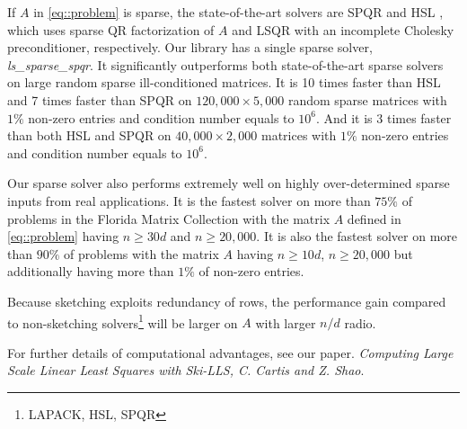 \documentclass[english,11pt]{article}
\begin{document}
If $A$ in \eqref{eq::problem} is sparse, the state-of-the-art solvers are SPQR \cite{Davis:2011ft} and HSL \cite{Scott:2014iq}, which uses sparse QR factorization of $A$ and LSQR with an incomplete Cholesky preconditioner, respectively. Our library has a single sparse solver, {\it ls_sparse_spqr}. It significantly outperforms both state-of-the-art sparse solvers on large random sparse ill-conditioned matrices. It is 10 times faster than HSL and 7 times faster than SPQR on $120,000 \times 5,000$ random sparse matrices with $1\%$ non-zero entries and condition number equals to $10^6$. And it is 3 times faster than both HSL and SPQR on $40,000 \times 2,000$ matrices with $1\%$ non-zero entries and condition number equals to $10^6$.

Our sparse solver also performs extremely well on highly over-determined sparse inputs from real applications. It is the fastest solver on more than $75 \%$ of problems in the Florida Matrix Collection \cite{Davis_2011} with the matrix $A$ defined in \eqref{eq::problem} having $n\geq 30d$ and $n \geq 20,000$. It is also the fastest solver on more than $90\%$ of problems with the matrix $A$ having $n\geq 10d$, $n \geq 20,000$ but additionally having more than $1\%$ of non-zero entries. 

Because sketching exploits redundancy of rows, the performance gain compared to non-sketching solvers\footnote{LAPACK, HSL, SPQR} will be larger on $A$ with larger $n/d$ radio.

For further details of computational advantages, see our paper. {\it{Computing Large Scale Linear Least Squares with Ski-LLS, C. Cartis and Z. Shao}}.



\end{document}
